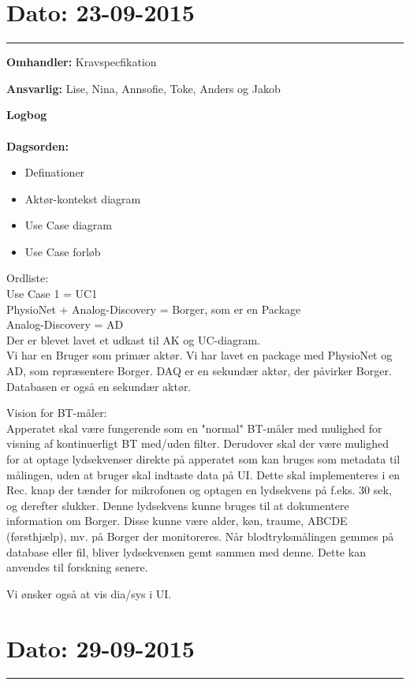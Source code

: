 \section{Dato: 23-09-2015 }
\hrule

\textbf{Omhandler:} Kravspecfikation 

\textbf{Ansvarlig:} Lise, Nina, Annsofie, Toke, Anders og Jakob

\textbf{Logbog}
\\
\\
\textbf{Dagsorden:}
\begin{itemize}
	\item Definationer
	\item Aktør-kontekst diagram
	\item Use Case diagram
	\item Use Case forløb
\end{itemize}

Ordliste:\\ 
Use Case 1 = UC1 \\
PhysioNet + Analog-Discovery = Borger, som er en Package \\
Analog-Discovery = AD \\

Der er blevet lavet et udkast til AK og UC-diagram. \\
Vi har en Bruger som primær aktør. Vi har lavet en package med PhysioNet og AD, som repræsentere Borger. DAQ er en sekundær aktør, der påvirker Borger. Databasen er også en sekundær aktør. 

Vision for BT-måler:\\
Apperatet skal være fungerende som en "normal" BT-måler med mulighed for visning af kontinuerligt BT med/uden filter. Derudover skal der være mulighed for at optage lydsekvenser direkte på apperatet som kan bruges som metadata til målingen, uden at bruger skal indtaste data på UI. Dette skal implementeres i en Rec. knap der tænder for mikrofonen og optagen en lydsekvens på f.eks. 30 sek, og derefter slukker. Denne lydsekvens kunne bruges til at dokumentere information om Borger. Disse kunne være alder, køn, traume, ABCDE (førsthjælp), mv. på Borger der monitoreres. 
Når blodtryksmålingen gemmes på database eller fil, bliver lydsekvensen gemt sammen med denne. Dette kan anvendes til forskning senere. 

Vi ønsker også at vis dia/sys i UI. 

	

\section{Dato: 29-09-2015 }
\hrule

